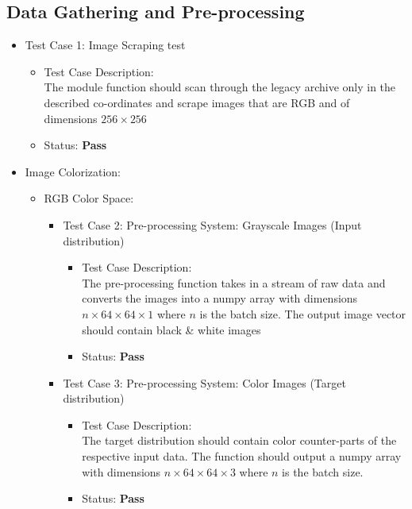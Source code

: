 \documentclass[oneside,a4paper,12pt]{report}
\begin{document}
\subsection{Data Gathering and Pre-processing}
\begin{itemize}
	\item Test Case 1: Image Scraping test
	\begin{itemize}
		\item Test Case Description:\\
			The module function should scan through the legacy archive only in the described co-ordinates and scrape images that are RGB and of dimensions $256 \times 256$
		\item Status: \textbf{Pass}
	\end{itemize}
	\item Image Colorization:
	\begin{itemize}
	\item RGB Color Space:
	\begin{itemize}
		\item Test Case 2: Pre-processing System: Grayscale Images (Input distribution)
	\begin{itemize}
		\item Test Case Description:\\
			The pre-processing function takes in a stream of raw data and converts the images into a numpy array with dimensions $n \times 64 \times 64 \times 1$ where $n$ is the batch size. The output image vector should contain black \& white images
		\item Status: \textbf{Pass}
	\end{itemize}
		\item Test Case 3: Pre-processing System: Color Images (Target distribution)
	\begin{itemize}
		\item Test Case Description:\\
			The target distribution should contain color counter-parts of the respective input data. The function should output a numpy array with dimensions $n \times 64 \times 64 \times 3$ where $n$ is the batch size.
		\item Status: \textbf{Pass}


\end{itemize}
\end{itemize}
\end{itemize}
\end{itemize}
\end{document}
